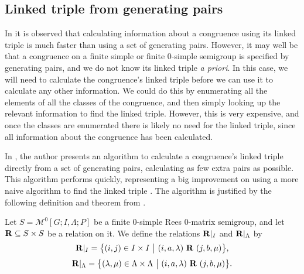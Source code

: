\subsection{Linked triple from generating pairs}
\label{sec:pairs-to-linked-triple}

In \cite[\S 6.1]{mtorpey_pre_msc} it is observed that calculating information
about a congruence using its linked triple is much faster than using a set of
generating pairs.  However, it may well be that a congruence on a finite
simple or finite 0-simple semigroup is specified by generating pairs, and we do
not know its linked triple \textit{a priori}.  In this case, we will need to
calculate the congruence's linked triple before we can use it to calculate any
other information.  We could do this by enumerating all the elements of all the
classes of the congruence, and then simply looking up the relevant information
to find the linked triple.  However, this is very expensive, and once the
classes are enumerated there is likely no need for the linked triple, since all
information about the congruence has been calculated.

In \cite[\S 3.2]{mtorpey_msc}, the author presents an algorithm to calculate a
congruence's linked triple directly from a set of generating pairs, calculating
as few extra pairs as possible.  This algorithm performs quickly, representing a
big improvement on using a more naive algorithm to find the linked triple
\cite[\S 6.1.2]{mtorpey_msc}.  The algorithm is justified by the following
definition and theorem from \cite{mtorpey_msc}.

\begin{definition}
  \label{def:ri}
  Let $S = \mathcal{M}^0[G;I,\Lambda;P]$ be a finite 0-simple Rees 0-matrix
  semigroup, and let $\mathbf{R} \subseteq S \times S$ be a relation on it.  We
  define the relations $\mathbf{R}|_I$ and $\mathbf{R}|_\Lambda$ by
  $$\mathbf{R}|_I = \big\{(i,j) \in I \times I ~\big|~
  (i,a,\lambda) ~\mathbf{R}~ (j,b,\mu)\big\},$$
  $$\mathbf{R}|_\Lambda = \big\{(\lambda,\mu) \in \Lambda \times \Lambda ~\big|~
  (i,a,\lambda) ~\mathbf{R}~ (j,b,\mu)\big\}.$$
\end{definition}

